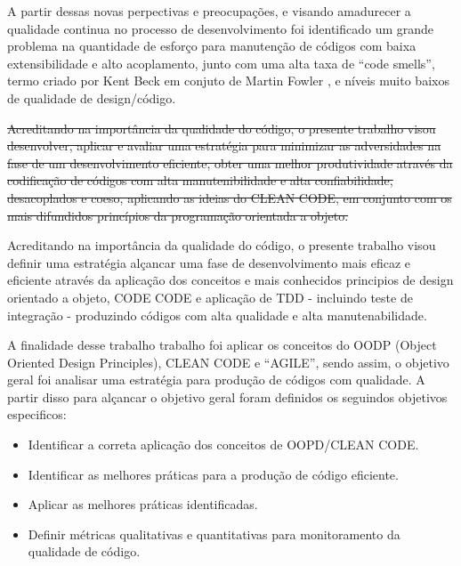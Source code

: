 \documentclass[12pt]{article}
\begin{document}
A partir dessas novas perpectivas e preocupações, e visando amadurecer a qualidade continua no processo de desenvolvimento foi identificado um grande problema na quantidade de esforço para manutenção de códigos com baixa extensibilidade e alto acoplamento, junto com uma alta taxa de “code smells”, termo criado por Kent Beck em conjuto de Martin Fowler \cite{MARTIN_FOWLER_REFACTORING}, e níveis muito baixos de qualidade de design/código.


\sout{Acreditando na importância da qualidade do código, o presente trabalho visou desenvolver, aplicar e avaliar uma estratégia para minimizar as adversidades na fase de um desenvolvimento eficiente, obter uma melhor produtividade através da codificação de códigos com alta manutenibilidade e alta confiabilidade, desacoplados e coeso, aplicando as ideias do CLEAN CODE, em conjunto com os mais difundidos princípios da programação orientada a objeto.}

Acreditando na importância da qualidade do código, o presente trabalho visou definir uma estratégia alçancar uma fase de desenvolvimento mais eficaz e eficiente através da aplicação dos conceitos e mais conhecidos principios de design orientado a objeto, CODE CODE e aplicação de TDD - incluindo teste de integração - produzindo códigos com alta qualidade e alta manutenabilidade.


A finalidade desse trabalho trabalho foi aplicar os conceitos do OODP (Object Oriented Design Principles), CLEAN CODE e “AGILE”, sendo assim, o objetivo geral foi analisar uma estratégia para produção de códigos com qualidade. A partir disso para alçancar o objetivo geral foram definidos os seguindos objetivos especificos: 
\begin{itemize}
	\item Identificar a correta aplicação dos conceitos de OOPD/CLEAN CODE.
	\item Identificar as melhores práticas para a produção de código eficiente.  

\sou	
	
	\item Aplicar as melhores práticas identificadas.
	\item Definir métricas qualitativas e quantitativas para monitoramento da qualidade de código.
\end{itemize} 
\end{document}
